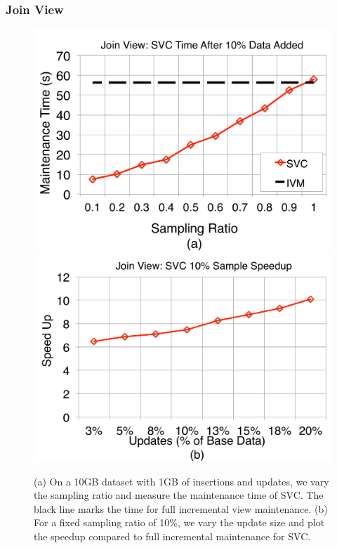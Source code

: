 \subsubsection{Join View}

\begin{figure}[t]
\centering
\includegraphics[scale=0.15]{exp/msj_1.pdf}
\includegraphics[scale=0.15]{exp/msj_2.pdf}
 \caption{(a) On a 10GB dataset with 1GB of insertions and updates, we vary the sampling ratio and measure the maintenance time of SVC. The black line marks the time for full incremental view maintenance. (b) For a fixed sampling ratio of 10\%, we vary the update size and plot the speedup compared to full incremental maintenance for SVC. \label{exp-1-samplesize}}
\end{figure}

